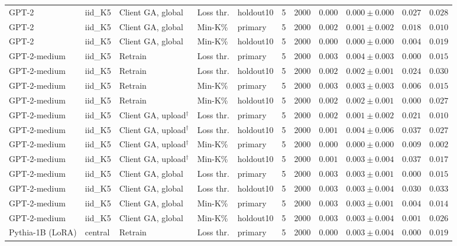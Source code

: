 {\begin{longtable}{@{\extracolsep{\fill}}lllllcccccc@{}}
GPT-2 & iid\_K5 & Client GA, global & Loss thr. & holdout10 & 5 & 2000 & $0.000$ & $0.000 \pm 0.000$ & $0.027$ & $0.028$ \\
GPT-2 & iid\_K5 & Client GA, global & Min-K\% & primary & 5 & 2000 & $0.002$ & $0.001 \pm 0.002$ & $0.018$ & $0.010$ \\
GPT-2 & iid\_K5 & Client GA, global & Min-K\% & holdout10 & 5 & 2000 & $0.000$ & $0.000 \pm 0.000$ & $0.004$ & $0.019$ \\
GPT-2-medium & iid\_K5 & Retrain & Loss thr. & primary & 5 & 2000 & $0.003$ & $0.004 \pm 0.003$ & $0.000$ & $0.015$ \\
GPT-2-medium & iid\_K5 & Retrain & Loss thr. & holdout10 & 5 & 2000 & $0.002$ & $0.002 \pm 0.001$ & $0.024$ & $0.030$ \\
GPT-2-medium & iid\_K5 & Retrain & Min-K\% & primary & 5 & 2000 & $0.003$ & $0.003 \pm 0.003$ & $0.006$ & $0.015$ \\
GPT-2-medium & iid\_K5 & Retrain & Min-K\% & holdout10 & 5 & 2000 & $0.002$ & $0.002 \pm 0.001$ & $0.000$ & $0.027$ \\
GPT-2-medium & iid\_K5 & Client GA, upload$^{\dagger}$ & Loss thr. & primary & 5 & 2000 & $0.002$ & $0.001 \pm 0.002$ & $0.021$ & $0.010$ \\
GPT-2-medium & iid\_K5 & Client GA, upload$^{\dagger}$ & Loss thr. & holdout10 & 5 & 2000 & $0.001$ & $0.004 \pm 0.006$ & $0.037$ & $0.027$ \\
GPT-2-medium & iid\_K5 & Client GA, upload$^{\dagger}$ & Min-K\% & primary & 5 & 2000 & $0.000$ & $0.000 \pm 0.000$ & $0.009$ & $0.002$ \\
GPT-2-medium & iid\_K5 & Client GA, upload$^{\dagger}$ & Min-K\% & holdout10 & 5 & 2000 & $0.001$ & $0.003 \pm 0.004$ & $0.037$ & $0.017$ \\
GPT-2-medium & iid\_K5 & Client GA, global & Loss thr. & primary & 5 & 2000 & $0.003$ & $0.003 \pm 0.001$ & $0.000$ & $0.015$ \\
GPT-2-medium & iid\_K5 & Client GA, global & Loss thr. & holdout10 & 5 & 2000 & $0.003$ & $0.003 \pm 0.004$ & $0.030$ & $0.033$ \\
GPT-2-medium & iid\_K5 & Client GA, global & Min-K\% & primary & 5 & 2000 & $0.003$ & $0.003 \pm 0.001$ & $0.004$ & $0.014$ \\
GPT-2-medium & iid\_K5 & Client GA, global & Min-K\% & holdout10 & 5 & 2000 & $0.003$ & $0.003 \pm 0.004$ & $0.001$ & $0.026$ \\
Pythia-1B (LoRA) & central & Retrain & Loss thr. & primary & 5 & 2000 & $0.000$ & $0.003 \pm 0.004$ & $0.000$ & $0.019$ \\

\end{longtable}}
